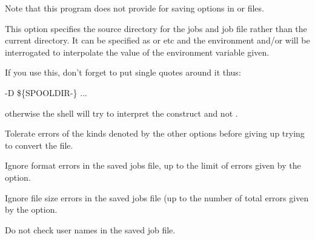 Note that this program does not provide for saving options in \configurationfile{} or \homeconfigpath{} files.



This option specifies the source directory for the jobs and job file
rather than the current directory. It can be specified as  or
 etc and the environment and/or \linebreak[3]\masterconfig{} will be
interrogated to interpolate the value of the environment variable given.

If you use this, don't forget to put single quotes around it thus:

\begin{expara}

\XbCjlistName{} -D
{\textquotesingle}\$\{SPOOLDIR-\spooldirname\}{\textquotesingle}
...

\end{expara}

otherwise the shell will try to interpret the \exampletext{\$} construct and not \PrXbCjlist{}.


Tolerate  errors of the kinds denoted by the other options before giving up trying to convert the file.


Ignore format errors in the saved jobs file, up to the limit of errors given by the  option.


Ignore file size errors in the saved jobs file (up to the number of total errors given by the 
option.


Do not check user names in the saved job file.



